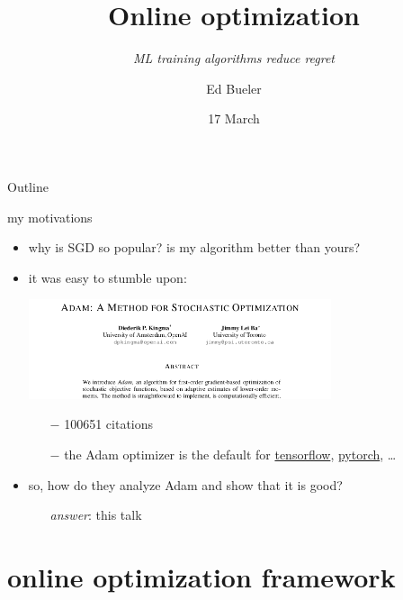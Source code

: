 \documentclass[xcolor={svgnames},
               hyperref={colorlinks,citecolor=DeepPink4,linkcolor=FireBrick,urlcolor=Maroon}]
               {beamer}
\title{Online optimization}
\subtitle{\emph{ML training algorithms reduce regret}}
\author{Ed Bueler}
\institute[UAF]{MATH 692 Mathematics for Machine Learning}
\date[Spring 2022]{17 March}
\begin{document}
\beamertemplatenavigationsymbolsempty

\begin{frame}
  \maketitle
\end{frame}


\begin{frame}{Outline}
  \tableofcontents[hideallsubsections]
\end{frame}


\begin{frame}{my motivations}

\begin{itemize}
\item why is SGD so popular? is my algorithm better than yours?

\medskip
\item it was easy to stumble upon:

\medskip
\begin{center}
\includegraphics[width=0.7\textwidth]{figs/adam-paper.png}
\end{center}

\medskip
    \begin{itemize}
    \item[$-$] 100651 citations
    \item[$-$] the Adam optimizer is the default for \href{https://www.tensorflow.org/tutorials/keras/classification}{tensorflow}, \href{https://pytorch.org/docs/stable/optim.html}{pytorch}, \dots
    \end{itemize}

\medskip
\item so, how do they analyze Adam and show that it is good?
    \begin{itemize}
    \item[] \emph{answer}: this talk
    \end{itemize}
\end{itemize}
\end{frame}


\section{online optimization framework}
\end{document}
